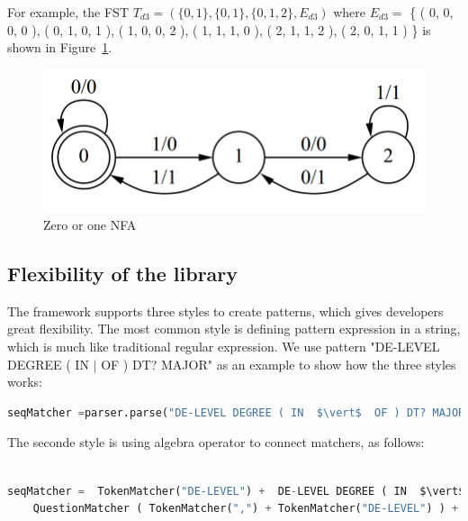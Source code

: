 For example, the FST $T_{d3} = \left(     \{ 0, 1 \} ,  \{ 0, 1 \} , \{ 0, 1 , 2 \} ,  E_{d3} \right ) $ where $E_{d3} = $ \{ ( 0, 0, 0, 0 ),   ( 0, 1, 0, 1 ), ( 1, 0, 0, 2 ), ( 1, 1, 1, 0 ), ( 2, 1, 1, 2 ), ( 2, 0, 1, 1 ) \}  is shown in Figure~\ref{fig:fst}.


\begin{figure}[htbp]
  \centering
  \includegraphics[scale=0.5]{images/fst.png}
  \caption{Zero or one NFA}
  \label{fig:fst}
\end{figure}


\subsection{Flexibility of the library}
The framework supports three styles to create patterns, which gives developers great flexibility. The most common style is defining pattern expression in a string, which is much like traditional regular expression. We use pattern "DE-LEVEL DEGREE ( IN  $\vert$  OF ) DT? MAJOR" as an example to show how the three styles works:

\begin{framed}
\small
\begin{lstlisting}[language=Python]
seqMatcher =parser.parse("DE-LEVEL DEGREE ( IN  $\vert$  OF ) DT? MAJOR")
\end{lstlisting}
\end{framed}

The seconde style is using algebra operator to connect matchers, as follows:
\begin{framed}
\small
\begin{lstlisting}[language=Python]

seqMatcher =  TokenMatcher("DE-LEVEL") +  DE-LEVEL DEGREE ( IN  $\vert$  OF ) DT? MAJOR
    QuestionMatcher ( TokenMatcher(",") + TokenMatcher("DE-LEVEL") ) + TokenMatcher("ccc")

\end{lstlisting}
\end{framed}

